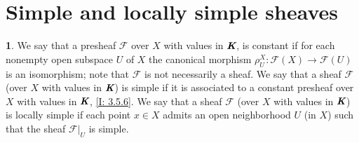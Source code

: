 \documentclass[12pt]{amsart}
\theoremstyle{definition}
\newtheorem{bk}[proposition]{}
\begin{document}
\section{Simple and locally simple sheaves}

\begin{bk}\label{I: 3.6.1} We say that a presheaf $\mathscr{F}$ over $X$ with values in $\emph{\textbf{K}}$, is constant if for each nonempty open subspace $U$ of $X$ the canonical morphism $\rho_{U}^{X}:\mathscr{F}(X)\rightarrow\mathscr{F}(U)$ is an isomorphism; note that $\mathscr{F}$ is not necessarily a sheaf. We say that a sheaf $\mathscr{F}$ (over $X$ with values in $\emph{\textbf{K}}$) is simple if it is  associated to a constant presheaf over $X$ with values in $\emph{\textbf{K}}$, \ref{I: 3.5.6}. We say that a sheaf $\mathscr{F}$ (over $X$ with values in $\emph{\textbf{K}}$) is locally simple if each point $x\in X$ admits an open neighborhood $U$ (in $X$) such that the sheaf $\mathscr{F}|_{U}$ is simple.

\end{bk}
\end{document}
